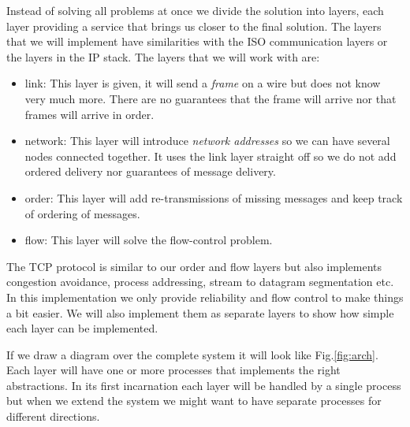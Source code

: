 \documentclass[a4paper,11pt]{article}
\begin{document}
Instead of solving all problems at once we divide the solution into
layers, each layer providing a service that brings us closer to the
final solution. The layers that we will implement have similarities
with the ISO communication layers or the layers in the IP stack. The
layers that we will work with are:

\begin{itemize}

\item link: This layer is given, it will send a {\em frame} on a
  wire but does not know very much more. There are no guarantees that the
  frame will arrive nor that frames will arrive in order.

\item network: This layer will introduce {\em network addresses} so we
  can have several nodes connected together. It uses the link layer
  straight off so we do not add ordered delivery nor guarantees of
  message delivery.

\item order: This layer will add re-transmissions of
  missing messages and keep track of ordering of messages. 
  
\item flow: This layer will solve the flow-control problem.

\end{itemize}

The TCP protocol is similar to our order and flow layers but also
implements congestion avoidance, process addressing, stream to datagram
segmentation etc. In this implementation we only provide reliability
and flow control to make things a bit easier. We will also implement
them as separate layers to show how simple each layer can be
implemented.

If we draw a diagram over the complete system it will look like
Fig.\ref{fig:arch}. Each layer will have one or more processes that
implements the right abstractions. In its first incarnation each layer
will be handled by a single process but when we extend the system we
might want to have separate processes for different directions.
\end{document}
